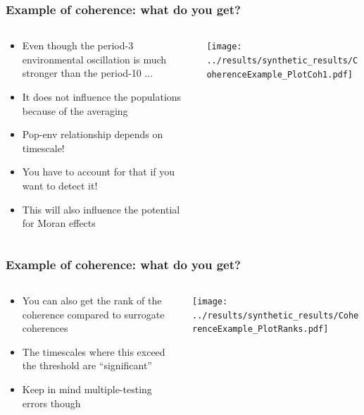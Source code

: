 \documentclass{beamer}
\begin{document}
\begin{frame}[fragile]
\frametitle{Example of coherence: what do you get?}
\begin{columns}[c]
\begin{column}{6cm}
\begin{itemize}
\item Even though the period-3 environmental oscillation is much stronger than the period-10 ...
\item It does not influence the populations because of the averaging
\item Pop-env relationship depends on timescale!
\item You have to account for that if you want to detect it!
\item This will also influence the potential for Moran effects
\end{itemize}
\end{column}
\begin{column}{6cm}
\texttt{[image: ../results/synthetic\_results/CoherenceExample\_PlotCoh1.pdf]}
\end{column}
\end{columns}
\end{frame}

\begin{frame}[fragile]
\frametitle{Example of coherence: what do you get?}
\begin{columns}[c]
\begin{column}{6cm}
\begin{itemize}
\item You can also get the rank of the coherence compared to surrogate coherences
\item The timescales where this exceed the threshold are ``significant''
\item Keep in mind multiple-testing errors though
\end{itemize}
\end{column}
\begin{column}{6cm}
\texttt{[image: ../results/synthetic\_results/CoherenceExample\_PlotRanks.pdf]}
\end{column}
\end{columns}
\end{frame}
\end{document}
